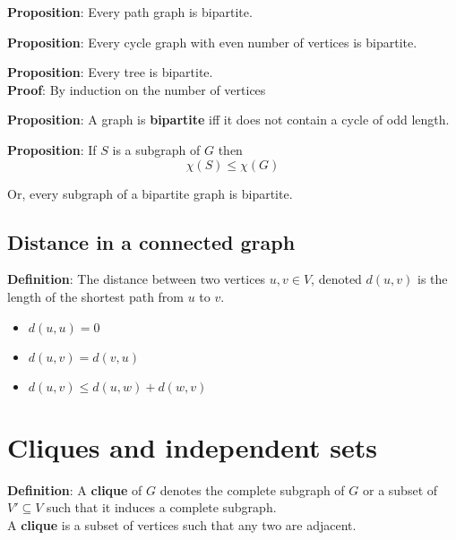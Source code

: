 \begin{framed}
   \textbf{Proposition}: Every path graph is bipartite.
\end{framed}

\begin{framed}
   \textbf{Proposition}: Every cycle graph with even number of vertices is bipartite.
\end{framed}

\begin{framed}
  \textbf{Proposition}: Every tree is bipartite.  \\

  \textbf{Proof}: By induction on the number of vertices
\end{framed}

\begin{framed}
   \textbf{Proposition}: A graph is \textbf{bipartite} iff it does not contain a cycle of odd length.
\end{framed}

\begin{framed}
   \textbf{Proposition}: If $S$ is a subgraph of $G$ then 
   \[
     \chi(S) \leq \chi(G)
   \] 

   Or, every subgraph of a bipartite graph is bipartite. 
\end{framed}

\subsection{Distance in a connected graph}
\begin{framed}
   \textbf{Definition}: The distance between two vertices $u, v \in V$, denoted $d(u, v)$ is the length of the shortest path from $u$ to $v$. 
   \begin{itemize}
      \item $d(u, u) = 0$
      \item $d(u, v) = d(v, u)$
      \item $d(u, v) \leq d(u, w) + d(w, v)$
   \end{itemize}
\end{framed}


\section{Cliques and independent sets}

\begin{framed}
   \textbf{Definition}: A \textbf{clique} of $G$ denotes the complete subgraph of $G$ or a subset of $V' \subseteq V$ such that it induces a complete subgraph. \\

   A \textbf{clique} is a subset of vertices such that any two are adjacent. 
\end{framed}

